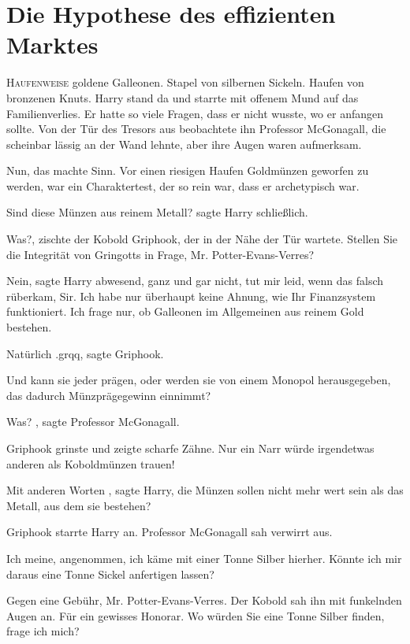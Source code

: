 \chapter{Die Hypothese des effizienten Marktes}

\lettrine{H}{aufenweise} goldene Galleonen. Stapel von silbernen Sickeln.
Haufen von bronzenen Knuts.
Harry stand da und starrte mit offenem Mund auf das Familienverlies. Er hatte so viele
Fragen, dass er nicht wusste, wo er anfangen sollte. Von der Tür des Tresors aus beobachtete ihn Professor McGonagall,
die scheinbar lässig an der Wand lehnte, aber ihre Augen waren aufmerksam.

Nun, das machte Sinn. Vor einen
riesigen Haufen Goldmünzen geworfen zu werden, war ein Charaktertest, der so rein war, dass er archetypisch war.

\glqq Sind diese Münzen aus reinem Metall?\grqq{} sagte Harry schließlich.

\glqq Was?\grqq{},
zischte der Kobold Griphook, der in der Nähe der Tür wartete. \glqq Stellen Sie die Integrität von Gringotts in Frage,
Mr. Potter-Evans-Verres?\grqq{}

\glqq Nein\grqq{}, sagte Harry abwesend, \glqq ganz und gar nicht, tut mir
leid, wenn das falsch rüberkam, Sir. Ich habe nur überhaupt keine Ahnung, wie Ihr Finanzsystem funktioniert. Ich frage
nur, ob Galleonen im Allgemeinen aus reinem Gold bestehen.\grqq{}

\glqq Natürlich\grqq{} .grqq{}, sagte Griphook.

\glqq Und kann sie jeder prägen, oder werden sie von einem Monopol herausgegeben, das dadurch
Münzprägegewinn einnimmt?\grqq{}

\glqq Was?\grqq{} , sagte Professor McGonagall.

Griphook grinste
und zeigte scharfe Zähne. \glqq Nur ein Narr würde irgendetwas anderen als Koboldmünzen trauen!\grqq{}

\glqq Mit anderen Worten\grqq{} , sagte Harry, \glqq die Münzen sollen nicht mehr wert sein als das Metall,
aus dem sie bestehen?\grqq{}

Griphook starrte Harry an. Professor McGonagall sah verwirrt aus.

\glqq Ich meine, angenommen, ich käme mit einer Tonne Silber hierher. Könnte ich mir daraus eine Tonne
Sickel anfertigen lassen?\grqq{}

\glqq Gegen eine Gebühr, Mr. Potter-Evans-Verres.\grqq{} Der Kobold sah ihn
mit funkelnden Augen an. \glqq Für ein gewisses Honorar. Wo würden Sie eine Tonne Silber finden, frage ich mich?\grqq{}

